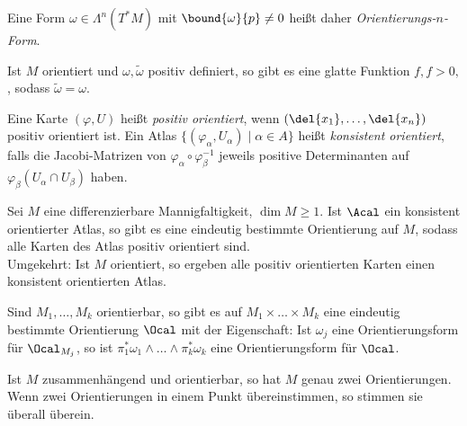 \begin{rem*}
	Eine Form \( \omega \in \Lambda^n(T^*M)\) mit \( \bound{\omega}{p} \neq 0 \) heißt daher \emph{Orientierungs-$n$-Form}.
\end{rem*}

Ist $M$ orientiert und $\omega, \tilde{\omega}$ positiv definiert, so gibt es eine glatte Funktion \( f, f > 0, \), sodass \( \tilde{\omega} = \omega \).

\begin{defn*}
	Eine Karte \( (\varphi,U) \) heißt \emph{positiv orientiert}, wenn \( (\del{x_1}, \dotsc, \del{x_n}) \) positiv orientiert ist. Ein Atlas \( \{(\varphi_\alpha, U_\alpha) \mid \alpha \in A\} \) heißt \emph{konsistent orientiert}, falls die Jacobi-Matrizen von \( \varphi_\alpha \circ \varphi_\beta^{-1} \) jeweils positive Determinanten auf \( \varphi_\beta(U_\alpha \cap U_\beta) \) haben.
\end{defn*}

\begin{lem}
	Sei $M$ eine differenzierbare Mannigfaltigkeit, $\dim M \geq 1$. Ist $\Acal$ ein konsistent orientierter Atlas, so gibt es eine eindeutig bestimmte Orientierung auf $M$, sodass alle Karten des Atlas positiv orientiert sind.\\
	Umgekehrt: Ist $M$ orientiert, so ergeben alle positiv orientierten Karten einen konsistent orientierten Atlas.
\end{lem}

\begin{lem}
	Sind \( M_1, \dotsc, M_k \) orientierbar, so gibt es auf \( M_1 \times \dots \times M_k \) eine eindeutig bestimmte Orientierung $\Ocal$ mit der Eigenschaft: Ist $\omega_j$ eine Orientierungsform für $\Ocal_{M_j}$, so ist \( \pi_1^*\omega_1 \wedge \dots \wedge \pi_k^*\omega_k \) eine Orientierungsform für $\Ocal$.
\end{lem}

\begin{lem}
	Ist $M$ zusammenhängend und orientierbar, so hat $M$ genau zwei Orientierungen. Wenn zwei Orientierungen in einem Punkt übereinstimmen, so stimmen sie überall überein.
\end{lem}